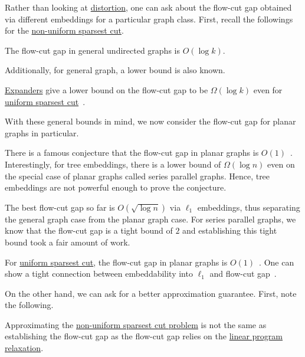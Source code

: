 Rather than looking at \hyperref[def:distortion]{distortion}, one can ask about the flow-cut gap obtained via different embeddings for a particular graph class. First, recall the followings for the \hyperref[prb:non-uniform-sparsest-cut]{non-uniform sparsest cut}.

\begin{prev}
	The flow-cut gap in general undirected graphs is \(O(\log k)\).
\end{prev}

Additionally, for general graph, a lower bound is also known.

\begin{remark}
	\hyperref[def:expander]{Expanders} give a lower bound on the flow-cut gap to be \(\Omega (\log k)\) even for \hyperref[prb:sparsest-cut]{uniform sparsest cut}~\cite{leighton1999multicommodity}.
\end{remark}

With these general bounds in mind, we now consider the flow-cut gap for planar graphs in particular.

\begin{eg}
	There is a famous conjecture that the flow-cut gap in planar graphs is \(O(1)\)~\cite{gupta2004cuts}. Interestingly, for tree embeddings, there is a lower bound of \(\Omega (\log n)\) even on the special case of planar graphs called series parallel graphs. Hence, tree embeddings are not powerful enough to prove the conjecture.

	The best flow-cut gap so far is \(O(\sqrt{\log n} )\) via \hyperref[def:l1-metric]{\(\ell _1\)} embeddings, thus separating the general graph case from the planar graph case. For series parallel graphs, we know that the flow-cut gap is a tight bound of \(2\) and establishing this tight bound took a fair amount of work.

	For \hyperref[prb:sparsest-cut]{uniform sparsest cut}, the flow-cut gap in planar graphs is \(O(1)\)~\cite{klein1993excluded}. One can show a tight connection between embeddability into \hyperref[def:l1-metric]{\(\ell _1\)} and flow-cut gap~\cite{gupta2004cuts}.
\end{eg}

On the other hand, we can ask for a better approximation guarantee. First, note the following.

\begin{note}
	Approximating the \hyperref[prb:non-uniform-sparsest-cut]{non-uniform sparsest cut problem} is not the same as establishing the flow-cut gap as the flow-cut gap relies on the \hyperref[eq:non-uniform-sparsest-cut-LP-primal]{linear program relaxation}.
\end{note}


